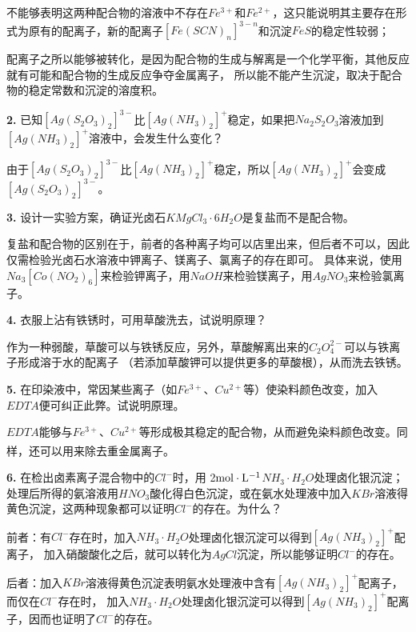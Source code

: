 \documentclass[a4paper,12pt]{article}
\begin{document}
不能够表明这两种配合物的溶液中不存在$Fe^{3+}$和$Fe^{2+}$，这只能说明其主要存在形式为原有的配离子，新的配离子$[Fe(SCN)_n]^{3-n}$和沉淀$FeS$的稳定性较弱；

配离子之所以能够被转化，是因为配合物的生成与解离是一个化学平衡，其他反应就有可能和配合物的生成反应争夺金属离子，
所以能不能产生沉淀，取决于配合物的稳定常数和沉淀的溶度积。

\noindent \textbf{2.} 已知$[Ag(S_2O_3)_2]^{3-}$比$[Ag(NH_3)_2]^+$稳定，如果把$Na_2S_2O_3$溶液加到$[Ag(NH_3)_2]^+$溶液中，会发生什么变化？

由于$[Ag(S_2O_3)_2]^{3-}$比$[Ag(NH_3)_2]^+$稳定，所以$[Ag(NH_3)_2]^+$会变成$[Ag(S_2O_3)_2]^{3-}$。


\noindent \textbf{3.} 设计一实验方案，确证光卤石$KMgCl_3\cdot 6H_2O$是复盐而不是配合物。

复盐和配合物的区别在于，前者的各种离子均可以店里出来，但后者不可以，因此仅需检验光卤石水溶液中钾离子、镁离子、氯离子的存在即可。
具体来说，使用$Na_3[Co(NO_2)_6]$来检验钾离子，用$NaOH$来检验镁离子，用$AgNO_3$来检验氯离子。

\noindent \textbf{4.} 衣服上沾有铁锈时，可用草酸洗去，试说明原理？

作为一种弱酸，草酸可以与铁锈反应，另外，草酸解离出来的$C_2O_4^{2-}$可以与铁离子形成溶于水的配离子
（若添加草酸钾可以提供更多的草酸根），从而洗去铁锈。

\noindent \textbf{5.} 在印染液中，常因某些离子（如$Fe^{3+}$、$Cu^{2+}$等）使染料颜色改变，加入$EDTA$便可纠正此弊。试说明原理。

$EDTA$能够与$Fe^{3+}$、$Cu^{2+}$等形成极其稳定的配合物，从而避免染料颜色改变。同样，还可以用来除去重金属离子\textsuperscript{\cite{NYBH20241011002}}。


\noindent \textbf{6.} 在检出卤素离子混合物中的$Cl^-$时，用 2$\rm mol\cdot L^{-1}$$NH_3\cdot H_2O$处理卤化银沉淀；
处理后所得的氨溶液用$HNO_3$酸化得白色沉淀，或在氨水处理液中加入$KBr$溶液得黄色沉淀，这两种现象都可以证明$Cl^-$的存在。为什么？

前者：有$Cl^-$存在时，加入$NH_3\cdot H_2O$处理卤化银沉淀可以得到$[Ag(NH_3)_2]^+$配离子，
加入硝酸酸化之后，就可以转化为$AgCl$沉淀，所以能够证明$Cl^-$的存在。

后者：加入$KBr$溶液得黄色沉淀表明氨水处理液中含有$[Ag(NH_3)_2]^+$配离子，而仅在$Cl^-$存在时，
加入$NH_3\cdot H_2O$处理卤化银沉淀可以得到$[Ag(NH_3)_2]^+$配离子，因而也证明了$Cl^-$的存在。



\end{document}

